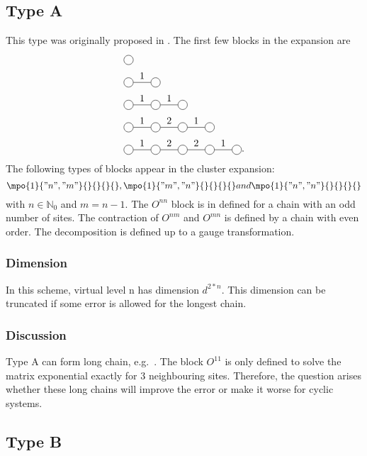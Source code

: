 
\subsection{Type A}
This type was originally proposed in \cite{Vanhecke2021}. The first few blocks in the expansion are
\begin{equation}
    \begin{split}
        &\mpob{1}{ {,}  }{}{}{}{{,,}} \\
        &\mpob{2}{ {,"1",}  }{}{}{}{{,,}}\\
        &\mpob{3}{ {,"1","1",}  }{}{}{}{{,,,}}\\
        &\mpob{4}{ {,"1","2","1",}  }{}{}{}{{,,,,,}}\\
        &\mpob{5}{ {,"1","2","2","1",}  }{}{}{}{{,,,,,}} .
    \end{split}
\end{equation}
The following types of blocks appear in the cluster expansion:
\begin{equation}
    \mpo{1}{ {"n","m"}  }{}{}{}{},\mpo{1}{ {"m ","n"}  }{}{}{}{} and \mpo{1}{ {"n","n"}  }{}{}{}{}
\end{equation}
with $n \in \mathbb{N}_0$ and $m=n-1$. The $O^{n n}$ block is in defined for a chain with an odd number of sites. The contraction of $O^{n m }$ and $O^{m n} $ is defined by a chain with even order. The decomposition is defined up to a gauge transformation.

\subsubsection{Dimension}

In this scheme, virtual level n has dimension $d^{2*n}$.  This dimension can be truncated if some error is allowed for the longest chain.

\subsubsection{Discussion}

Type A can form long chain, e.g.\
. The block $O^{1 1}$ is only defined to solve the matrix exponential exactly for 3 neighbouring sites. Therefore, the question arises whether these long chains will improve the error or make it worse for cyclic systems.

\subsection{Type B}

